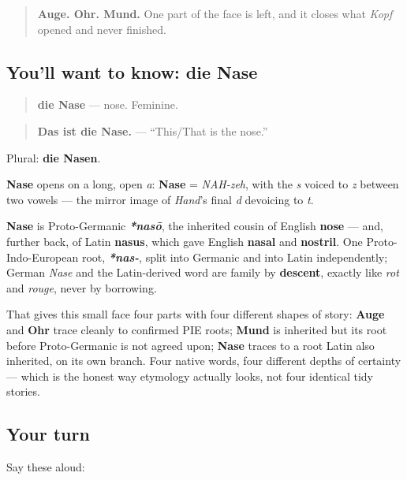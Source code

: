 \label{lesson:GE-C30-nase}



\begin{quote}
\textbf{Auge. Ohr. Mund.} One part of the face is left, and it closes what \emph{Kopf} opened and never finished.
\end{quote}

\subsection*{You'll want to know: die Nase}
\begin{quote}
\textbf{die Nase} — nose. Feminine.
\end{quote}

\begin{quote}
\textbf{Das ist die Nase.} — \textquotedblleft{}This/That is the nose.\textquotedblright{}
\end{quote}

Plural: \textbf{die Nasen}.

\begin{sounds}
\textbf{Nase} opens on a long, open \emph{a}: \textbf{Nase} = \emph{NAH-zeh}, with the \emph{s} voiced to \emph{z} between two vowels — the mirror image of \emph{Hand}'s final \emph{d} devoicing to \emph{t}.
\end{sounds}

\begin{cousinweb}
\textbf{Nase} is Proto-Germanic \emph{\textbf{*nasō}}, the inherited cousin of English \textbf{nose} — and, further back, of Latin \textbf{nasus}, which gave English \textbf{nasal} and \textbf{nostril}. One Proto-Indo-European root, \emph{\textbf{*nas-}}, split into Germanic and into Latin independently; German \emph{Nase} and the Latin-derived word are family by \textbf{descent}, exactly like \emph{rot} and \emph{rouge}, never by borrowing.

That gives this small face four parts with four different shapes of story: \textbf{Auge} and \textbf{Ohr} trace cleanly to confirmed PIE roots; \textbf{Mund} is inherited but its root before Proto-Germanic is not agreed upon; \textbf{Nase} traces to a root Latin also inherited, on its own branch. Four native words, four different depths of certainty — which is the honest way etymology actually looks, not four identical tidy stories.
\end{cousinweb}

\subsection*{Your turn}
Say these aloud:

